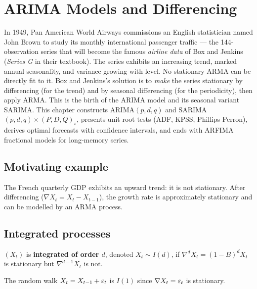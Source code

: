 \chapter{ARIMA Models and Differencing}
\label{ch:arima}

In 1949, Pan American World Airways commissions an English statistician named John Brown to study its monthly international passenger traffic --- the 144-observation series that will become the famous \emph{airline data} of Box and Jenkins (\emph{Series G} in their textbook). The series exhibits an increasing trend, marked annual seasonality, and variance growing with level. No stationary ARMA can be directly fit to it. Box and Jenkins's solution is to \emph{make} the series stationary by differencing (for the trend) and by seasonal differencing (for the periodicity), then apply ARMA. This is the birth of the ARIMA model and its seasonal variant SARIMA. This chapter constructs ARIMA$(p,d,q)$ and SARIMA$(p,d,q) \times (P,D,Q)_s$, presents unit-root tests (ADF, KPSS, Phillips-Perron), derives optimal forecasts with confidence intervals, and ends with ARFIMA fractional models for long-memory series.

\section{Motivating example}
The French quarterly GDP exhibits an upward trend: it is not stationary. After differencing ($\nabla X_t = X_t - X_{t-1}$), the growth rate is approximately stationary and can be modelled by an ARMA process.

\section{Integrated processes}

\begin{definition}
$(X_t)$ is \textbf{integrated of order $d$}, denoted $X_t\sim I(d)$, if $\nabla^d X_t = (1-B)^d X_t$ is stationary but $\nabla^{d-1}X_t$ is not.
\end{definition}

\begin{example}
The random walk $X_t=X_{t-1}+\varepsilon_t$ is $I(1)$ since $\nabla X_t = \varepsilon_t$ is stationary.
\end{example}

